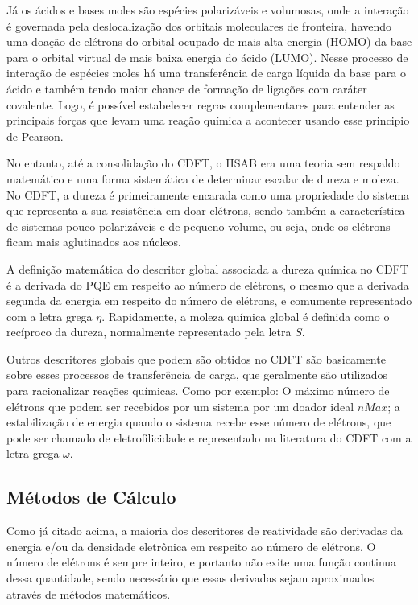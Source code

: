 \documentclass[a4paper,11pt]{refart}
\begin{document}
Já os ácidos e bases moles são espécies polarizáveis e volumosas, onde a interação é governada pela deslocalização dos orbitais moleculares de fronteira, havendo uma doação de elétrons do orbital ocupado de mais alta energia (HOMO) da base para o orbital virtual de mais baixa energia do ácido (LUMO). Nesse processo de interação de espécies moles há uma transferência de carga líquida da base para o ácido e também tendo maior chance de formação de ligações com caráter covalente. Logo, é possível estabelecer regras complementares para entender as principais forças que levam uma reação química a acontecer usando esse principio de Pearson.

No entanto, até a consolidação do CDFT, o HSAB era uma teoria sem respaldo matemático e uma forma sistemática de determinar escalar de dureza e moleza. No CDFT, a dureza é primeiramente encarada como uma propriedade do sistema que representa a sua resistência em doar elétrons, sendo também a característica de sistemas pouco polarizáveis e de pequeno volume, ou seja, onde os elétrons ficam mais aglutinados aos núcleos.

A definição matemática do descritor global associada a dureza química no CDFT é a derivada do PQE em respeito ao número de elétrons, o mesmo que a derivada segunda da energia em respeito do número de elétrons, e comumente representado com a letra grega $\eta$. Rapidamente, a moleza química global é definida como o recíproco da dureza, normalmente representado pela letra $S$.

Outros descritores globais que podem são obtidos no CDFT são basicamente sobre esses processos de transferência de carga, que geralmente são utilizados para racionalizar reações químicas. Como por exemplo: O máximo número de elétrons que podem ser recebidos por um sistema por um doador ideal $nMax$; a estabilização de energia quando o sistema recebe esse número de elétrons, que pode ser chamado de eletrofilicidade e representado na literatura do CDFT com a letra grega $\omega$\cite{Pearson1990}.  

\subsection{Métodos de Cálculo}

Como já citado acima, a maioria dos descritores de reatividade são derivadas da energia e/ou da densidade eletrônica em respeito ao número de elétrons. O número de elétrons é sempre inteiro, e portanto não exite uma função continua dessa quantidade, sendo necessário que essas derivadas sejam aproximados através de métodos matemáticos. 
\end{document}
